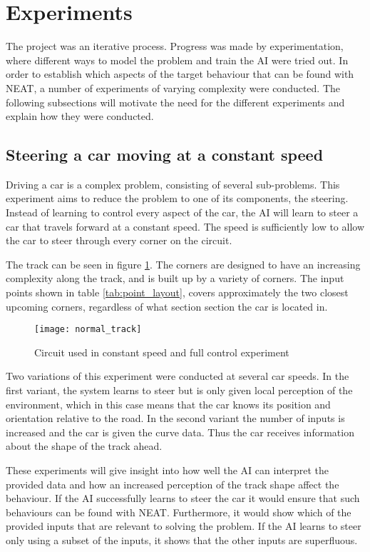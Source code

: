 \section{Experiments}
The project was an iterative process. Progress was made by experimentation, where different ways to model the problem and train the AI were tried out. In order to establish which aspects of the target behaviour that can be found with NEAT, a number of experiments of varying complexity were conducted. The following subsections will motivate the need for the different experiments and explain how they were conducted.

\subsection{Steering a car moving at a constant speed}
\label{method:constant_speed}
Driving a car is a complex problem, consisting of several sub-problems. This experiment aims to reduce the problem to one of its components, the steering. Instead of learning to control every aspect of the car, the AI will learn to steer a car that travels forward at a constant speed. The speed is sufficiently low to allow the car to steer through every corner on the circuit. 

The track can be seen in figure \ref{fig:normal_track}. The corners are designed to have an increasing complexity along the track, and is built up by a variety of corners. The input points shown in table \ref{tab:point_layout}, covers approximately the two closest upcoming corners, regardless of what section section the car is located in.

\begin{figure}
\texttt{[image: normal\_track]}
\caption{Circuit used in constant speed and full control experiment}
\label{fig:normal_track}
\centering
\end{figure}

Two variations of this experiment were conducted at several car speeds. In the first variant, the system learns to steer but is only given local perception of the environment, which in this case means that the car knows its position and orientation relative to the road. In the second variant the number of inputs is increased and the car is given the curve data. Thus the car receives information about the shape of the track ahead.

These experiments will give insight into how well the AI can interpret the provided data and how an increased perception of the track shape affect the behaviour. If the AI successfully learns to steer the car it would ensure that such behaviours can be found with NEAT. Furthermore, it would show which of the provided inputs that are relevant to solving the problem. If the AI learns to steer only using a subset of the inputs, it shows that the other inputs are superfluous. 

